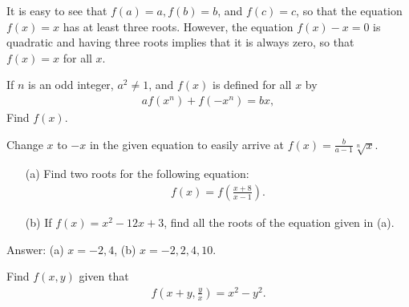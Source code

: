 \documentclass[12pt,a4paper]{memoir}
\theoremstyle{definition}
\begin{document}
\begin{solution}[name=Solution by Parviz Shahriari]
	It is easy to see that $f(a)=a, f(b)=b$, and $f(c)=c$, so that the equation $f(x)=x$ has at least three roots. However, the equation $f(x)-x=0$ is quadratic and having three roots implies that it is always zero, so that $f(x)=x$ for all $x$.
\end{solution}


\begin{tcolorbox}
	\begin{question}
		If $n$ is an odd integer, $a^2 \neq 1$, and $f(x)$ is defined for all $x$ by
		\begin{align*}
			af(x^n) + f(-x^n) = bx,
		\end{align*}
		Find $f(x)$.
	\end{question}
\end{tcolorbox}

\begin{solution}[name=Solution by Parviz Shahriari]
	Change $x$ to $-x$ in the given equation to easily arrive at $f(x)=\frac{b}{a-1}\sqrt[n]{x}$.
\end{solution}



\begin{tcolorbox}
	\begin{question}
		\begin{itemize}
			\item[(a)] Find two roots for the following equation:
			\begin{align*}
				f(x)=f\left(\frac{x+8}{x-1}\right).
			\end{align*}
			\item[(b)] If $f(x)=x^2-12x+3$, find all the roots of the equation given in (a).
		\end{itemize}
	\end{question}
\end{tcolorbox}

\begin{solution}[name=Solution by Parviz Shahriari]
	Answer: (a) $x=-2, 4$, (b) $x=-2, 2, 4, 10$.
\end{solution}


\begin{tcolorbox}
	\begin{question}
		Find $f(x,y)$ given that
		\begin{align*}
			f\left(x+y, \frac{y}{x}\right) = x^2 - y^2.
		\end{align*}
	\end{question}
\end{tcolorbox}
\end{document}
